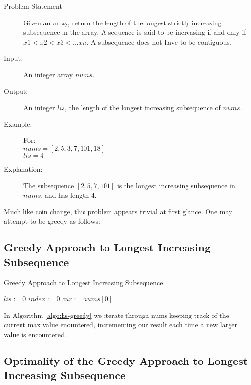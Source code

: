 
\begin{description}
    \item[Problem Statement:]
        Given an array, return the length of the longest strictly increasing subsequence in the array.
        A sequence is said to be increasing if and only if $x1<x2<x3<...xn$.
        A subsequence does not have to be contiguous.

    \item[Input:]
        An integer array $nums$.
        
    \item[Output:]
        An integer $lis$, the length of the longest increasing subsequence of $nums$.
    \item[Example:] For:\\
        $nums = [2,5,3,7,101,18]$\\
        $lis = 4$

    \item[Explanation:]
    The subsequence $[2,5,7,101]$ is the longest increasing subsequence in $nums$, and has length $4$.

        
\end{description}

Much like coin change, this problem appears trivial at first glance. One may attempt to be greedy as follows:

\subsection{Greedy Approach to Longest Increasing Subsequence}

\begin{algorithm}
    \caption{Greedy Approach to Longest Increasing Subsequence}
    \label{algo:lis-greedy}
    $lis := 0$\;
    $index := 0$\;
    $cur := nums[0]$\;
\end{algorithm}


In Algorithm \ref{algo:lis-greedy} we iterate through nums keeping track of the current max value enountered, incrementing our result each time a new larger value is encountered.

\subsection{Optimality of the Greedy Approach to Longest Increasing Subsequence}

